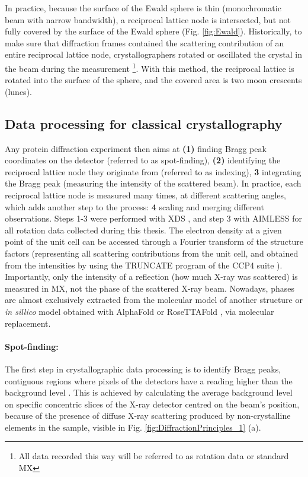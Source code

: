 In practice, because the surface of the Ewald sphere is thin (monochromatic beam with narrow bandwidth), a reciprocal lattice node is intersected, but not fully covered by the surface of the Ewald sphere (Fig. \ref{fig:Ewald}). Historically, to make sure that diffraction frames contained the scattering contribution of an entire reciprocal lattice node, crystallographers rotated or oscillated the crystal in the beam during the measurement \footnote{All data recorded this way will be referred to as rotation data or standard MX}. With this method, the reciprocal lattice is rotated into the surface of the sphere, and the covered area is two moon crescents (lunes).

\subsection{Data processing for classical crystallography}\label{sec:classic}

Any protein diffraction experiment then aims at \textbf{(1)} finding Bragg peak coordinates on the detector (referred to as spot-finding), \textbf{(2)} identifying the reciprocal lattice node they originate from (referred to as indexing), \textbf{3} integrating the Bragg peak (measuring the intensity of the scattered beam). In practice, each reciprocal lattice node is measured many times, at different scattering angles, which adds another step to the process: \textbf{4} scaling and merging different observations. Steps 1-3 were performed with XDS \parencite{kabschXDS2010}, and step 3 with AIMLESS \parencite{evansHowGoodAre2013} for all rotation data collected during this thesis. The electron density at a given point of the unit cell can be accessed through a Fourier transform of the structure factors (representing all scattering contributions from the unit cell, and obtained from the intensities by using the TRUNCATE program of the CCP4 suite \parencite{agirreCCP4SuiteIntegrative2023}). Importantly, only the intensity of a reflection (how much X-ray was scattered) is measured in MX, not the phase of the scattered X-ray beam. Nowadays, phases are almost exclusively extracted from the molecular model of another structure or \textit{in sillico} model obtained with AlphaFold \parencite{jumperHighlyAccurateProtein2021, abramsonAccurateStructurePrediction2024} or RoseTTAFold \parencite{baekAccuratePredictionProtein2021}, via molecular replacement. 

\paragraph{Spot-finding:} The first step in crystallographic data processing is to identify Bragg peaks, contiguous regions where pixels of the detectors have a reading higher than the background level \parencite{drenthTheoryXrayDiffraction1999}. This is achieved by calculating the average background level on specific concentric slices of the X-ray detector centred on the beam's position, because of the presence of diffuse X-ray scattering produced by non-crystalline elements in the sample, visible in Fig. \ref{fig:DiffractionPrinciples_1} (a).

